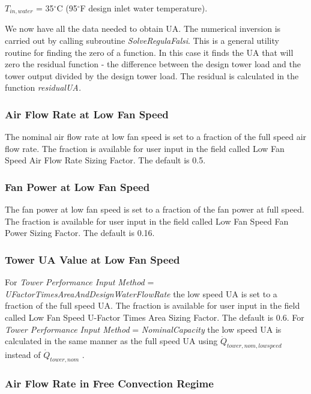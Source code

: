 \(T_{in,water}\) = 35\(^{\circ}\)C (95\(^{\circ}\)F design inlet water temperature).

We now have all the data needed to obtain UA. The numerical inversion is carried out by calling subroutine \emph{SolveRegulaFalsi}. This is a general utility routine for finding the zero of a function. In this case it finds the UA that will zero the residual function - the difference between the design tower load and the tower output divided by the design tower load. The residual is calculated in the function \emph{residualUA.}

\subsubsection{Air Flow Rate at Low Fan Speed}\label{air-flow-rate-at-low-fan-speed}

The nominal air flow rate at low fan speed is set to a fraction of the full speed air flow rate. The fraction is available for user input in the field called Low Fan Speed Air Flow Rate Sizing Factor. The default is 0.5.

\subsubsection{Fan Power at Low Fan Speed}\label{fan-power-at-low-fan-speed}

The fan power at low fan speed is set to a fraction of the fan power at full speed. The fraction is available for user input in the field called Low Fan Speed Fan Power Sizing Factor. The default is 0.16.

\subsubsection{Tower UA Value at Low Fan Speed}\label{tower-ua-value-at-low-fan-speed}

For \emph{Tower Performance Input Method} = \emph{UFactorTimesAreaAndDesignWaterFlowRate} the low speed UA is set to a fraction of the full speed UA. The fraction is available for user input in the field called Low Fan Speed U-Factor Times Area Sizing Factor. The default is 0.6. For \emph{Tower Performance Input Method} = \emph{NominalCapacity} the low speed UA is calculated in the same manner as the full speed UA using \(\dot Q_{tower,nom,lowspeed}\) instead of \(\dot Q_{tower,nom}\) .

\subsubsection{Air Flow Rate in Free Convection Regime}\label{air-flow-rate-in-free-convection-regime}

